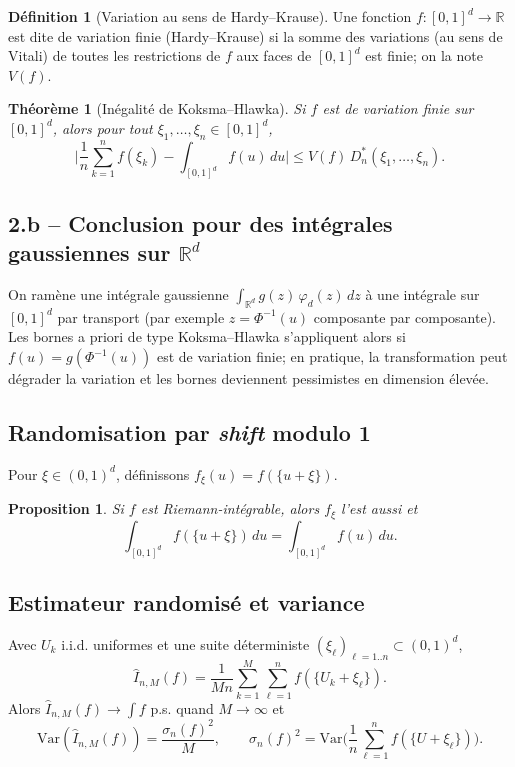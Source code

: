 \documentclass[11pt,a4paper]{article}
\newcommand{\R}{\mathbb{R}}
\newcommand{\1}{\mathbbm{1}}
\newcommand{\Var}{\mathrm{Var}}
\theoremstyle{plain}
\newtheorem{theorem}{Théorème}
\newtheorem{proposition}{Proposition}
\theoremstyle{definition}
\newtheorem{definition}{Définition}
\begin{document}
\begin{definition}[Variation au sens de Hardy--Krause]
Une fonction $f:[0,1]^d\to\R$ est dite de variation finie (Hardy--Krause) si la somme des variations (au sens de Vitali) de toutes les restrictions de $f$ aux faces de $[0,1]^d$ est finie; on la note $V(f)$.
\end{definition}

\begin{theorem}[Inégalité de Koksma--Hlawka]
Si $f$ est de variation finie sur $[0,1]^d$, alors pour tout $\xi_1,\dots,\xi_n\in[0,1]^d$,
\[
\Big|\frac1n\sum_{k=1}^n f(\xi_k)-\int_{[0,1]^d}f(u)\,du\Big|
\le V(f)\,D_n^*(\xi_1,\dots,\xi_n).
\]
\end{theorem}

\subsection{2.b -- Conclusion pour des intégrales gaussiennes sur $\R^d$}
On ramène une intégrale gaussienne $\int_{\R^d} g(z)\,\varphi_d(z)\,dz$ à une intégrale sur $[0,1]^d$ par transport (par exemple $z=\Phi^{-1}(u)$ composante par composante). Les bornes a priori de type Koksma--Hlawka s'appliquent alors si $f(u)=g(\Phi^{-1}(u))$ est de variation finie; en pratique, la transformation peut dégrader la variation et les bornes deviennent pessimistes en dimension élevée.

\subsection{Randomisation par \emph{shift} modulo 1}
Pour $\xi\in(0,1)^d$, définissons $f_\xi(u)=f(\{u+\xi\})$.
\begin{proposition}
Si $f$ est Riemann-intégrable, alors $f_\xi$ l'est aussi et
\[
\int_{[0,1]^d} f(\{u+\xi\})\,du=\int_{[0,1]^d}f(u)\,du.
\]
\end{proposition}

\subsection{Estimateur randomisé et variance}
Avec $U_k$ i.i.d. uniformes et une suite déterministe $(\xi_\ell)_{\ell=1..n}\subset(0,1)^d$,
\[
\widehat I_{n,M}(f)=\frac1{Mn}\sum_{k=1}^M\sum_{\ell=1}^n f(\{U_k+\xi_\ell\}).
\]
Alors $\widehat I_{n,M}(f)\to \int f$ p.s. quand $M\to\infty$ et
\[
\Var(\widehat I_{n,M}(f))=\frac{\sigma_n(f)^2}{M},
\qquad
\sigma_n(f)^2=\Var\Big(\frac1n\sum_{\ell=1}^n f(\{U+\xi_\ell\})\Big).
\]
\end{document}
